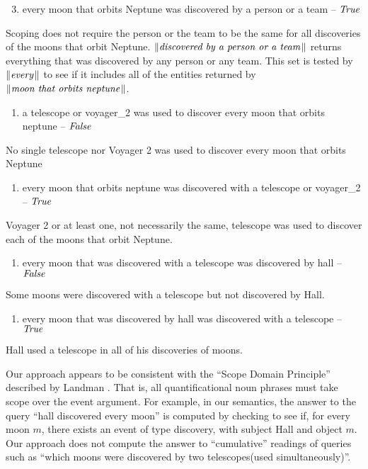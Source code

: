 \documentclass[../main.tex]{subfiles}
\begin{document}
\begin{refsection}
\begin{enumerate}[before=\small, label=\alph*.]
	\setcounter{enumi}{2}
	\item every moon that orbits Neptune was discovered by a person or a team – $\operatorname{\mathit{True}}$
\end{enumerate}
\noindent Scoping does not require the person or the team to be the same for all discoveries of the moons that
orbit Neptune. $\lVert\textit{discovered by a person or a team\hspace{0.1em}}\rVert$ returns everything that was discovered by any
person or any team. This set is tested by $\lVert\textit{every\hspace{0.1em}}\rVert$ to see if it includes all of the entities returned by
$\lVert\textit{moon that orbits neptune\hspace{0.1em}}\rVert$.
\begin{enumerate}[before=\small, label=\alph*.]
	\setlength\itemsep{0em}
	\setcounter{enumi}{3}
	\item a telescope or voyager\_2 was used to discover every moon that orbits neptune – $\operatorname{\mathit{False}}$
\end{enumerate}
\noindent No single telescope nor Voyager 2 was used to discover every moon that orbits Neptune
\begin{enumerate}[before=\small, label=\alph*.]
	\setlength\itemsep{0em}
	\setcounter{enumi}{4}
	\item every moon that orbits neptune was discovered with a telescope or voyager\_2 – $\operatorname{\mathit{True}}$
\end{enumerate}
\noindent Voyager 2 or at least one, not necessarily the same, telescope was used to discover each of the moons
that orbit Neptune.
\begin{enumerate}[before=\small, label=\alph*.]
	\setlength\itemsep{0em}
	\setcounter{enumi}{5}
	\item every moon  that was discovered  with a telescope was discovered by hall – $\operatorname{\mathit{False}}$
\end{enumerate}
\noindent  Some moons were discovered with a telescope but not discovered by Hall.
\begin{enumerate}[before=\small, label=\alph*.]
	\setlength\itemsep{0em}
	\setcounter{enumi}{6}
	\item every moon  that was discovered by hall was discovered with a telescope – $\operatorname{\mathit{True}}$
\end{enumerate}
\noindent Hall used a telescope in all of his discoveries of moons.

Our approach appears to be consistent with the ``Scope Domain Principle'' described by Landman \cite{landman1996plurality}. That is, all
quantificational noun phrases must take scope over the event argument. For example, in our semantics,
the answer to the query ``hall discovered every moon'' is computed by checking to see if, for every moon
$m$, there exists an event of type discovery, with subject Hall and object $m$. Our approach does not
compute the answer to ``cumulative'' readings of queries such as ``which moons were discovered by two
telescopes(used simultaneously)''.


\end{refsection}
\end{document}
